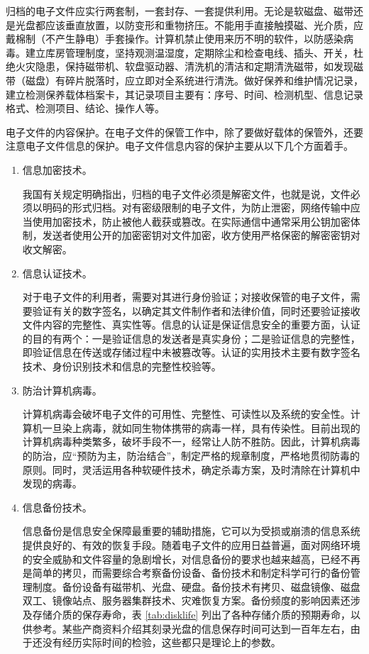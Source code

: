 \begin{enumerate.zh}
            归档的电子文件应实行两套制，一套封存、一套提供利用。无论是软磁盘、磁带还是光盘都应该垂直放置，以防变形和重物挤压。不能用手直接触摸磁、光介质，应戴棉制（不产生静电）手套操作。计算机禁止使用来历不明的软件，以防感染病毒。建立库房管理制度，坚持观测温湿度，定期除尘和检查电线、插头、开关，杜绝火灾隐患，保持磁带机、软盘驱动器、清洗机的清洁和定期清洗磁带，如发现磁带（磁盘）有碎片脱落时，应立即对全系统进行清洗。做好保养和维护情况记录，建立检测保养载体档案卡，其记录项目主要有：序号、时间、检测机型、信息记录格式、检测项目、结论、操作人等。

    \item 电子文件的内容保护。在电子文件的保管工作中，除了要做好载体的保管外，还要注意电子文件信息的保护。电子文件信息内容的保护主要从以下几个方面着手。
        \begin{enumerate}
            \item  信息加密技术。

            我国有关规定明确指出，归档的电子文件必须是解密文件，也就是说，文件必须以明码的形式归档。对有密级限制的电子文件，为防止泄密，网络传输中应当使用加密技术，防止被他人截获或篡改。在实际通信中通常采用公钥加密体制，发送者使用公开的加密密钥对文件加密，收方使用严格保密的解密密钥对收文解密。

            \item  信息认证技术。

            对于电子文件的利用者，需要对其进行身份验证；对接收保管的电子文件，需要验证有关的数字签名，以确定其文件制作者和法律价值，同时还要验证接收文件内容的完整性、真实性等。信息的认证是保证信息安全的重要方面，认证的目的有两个：一是验证信息的发送者是真实身份；二是验证信息的完整性，即验证信息在传送或存储过程中未被篡改等。认证的实用技术主要有数字签名技术、身份识别技术和信息的完整性校验等。

            \item  防治计算机病毒。

            计算机病毒会破坏电子文件的可用性、完整性、可读性以及系统的安全性。计算机一旦染上病毒，就如同生物体携带的病毒一样，具有传染性。目前出现的计算机病毒种类繁多，破坏手段不一，经常让人防不胜防。因此，计算机病毒的防治，应“预防为主，防治结合”，制定严格的规章制度，严格地贯彻防毒的原则。同时，灵活运用各种软硬件技术，确定杀毒方案，及时清除在计算机中发现的病毒。

            \item  信息备份技术。

            信息备份是信息安全保障最重要的辅助措施，它可以为受损或崩溃的信息系统提供良好的、有效的恢复手段。随着电子文件的应用日益普遍，面对网络环境的安全威胁和文件容量的急剧增长，对信息备份的要求也越来越高，已经不再是简单的拷贝，而需要综合考察备份设备、备份技术和制定科学可行的备份管理制度。备份设备有磁带机、光盘、硬盘。备份技术有拷贝、磁盘镜像、磁盘双工、镜像站点、服务器集群技术、灾难恢复方案。备份频度的影响因素还涉及存储介质的保存寿命，表 \ref{tab:disklife} 列出了各种存储介质的预期寿命，以供参考。某些产商资料介绍其刻录光盘的信息保存时间可达到一百年左右，由于还没有经历实际时间的检验，这些都只是理论上的参数。


\end{enumerate}
\end{enumerate.zh}
